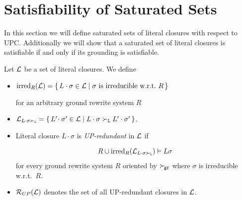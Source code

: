         

\section{Satisfiability of Saturated Sets}\label{sec:inst:saturated:sets}

In this section we will define saturated sets of literal closures
with respect to UPC.
Additionally we will show that a saturated set of literal closures
is satisfiable if and only if its grounding is satisfiable.

   \begin{definition}[UP-Redundancy]
        Let \( \mathcal{L} \) be a set of literal closures. We define
       \begin{itemize}
           \item \( \operatorname{irred}_R(\mathcal{L}) =
           \{ \,
            L\cdot\sigma\in\mathcal{L} \mid
           \sigma\text{ is irreducible w.r.t.~}R
           \, \} \)

        for an arbitrary ground rewrite system \( R \)

       \item
       \(
       \mathcal{L}_{L\cdot\sigma\mathrel\succ_{\mathtt{L}}} =
       \{ \,
        L'\!\cdot\sigma'\in\mathcal{L} \mid
        L\cdot\sigma\mathrel\succ_{\mathtt{L}} L'\cdot\sigma'
       \, \}
         \).

       \item Literal closure \( L\cdot\sigma \) is \emph{UP-redundant} in \( \mathcal{L} \) if

       \begin{gather*}
            R \cup \operatorname{irred}_R(\mathcal{L}_{L\cdot\sigma\mathrel\succ_{\mathtt{L}}}) \vDash L\sigma
       \end{gather*}
        for every ground rewrite system \( R \)
        oriented by \( \mathrel\succ_{\!\mathtt{gr}} \)
        where \( \sigma \) is irreducible w.r.t.~\( R \).

       \item
       \( \mathcal{R}_{UP}(\mathcal{L}) \) denotes the set of all UP-redundant closures in \( \mathcal{L} \).
   \end{itemize}
\end{definition}

